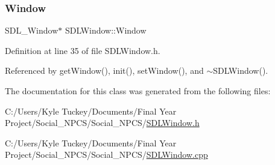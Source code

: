 \subsubsection{\texorpdfstring{Window}{Window}}
{\footnotesize\ttfamily S\+D\+L\+\_\+\+Window$\ast$ S\+D\+L\+Window\+::\+Window\hspace{0.3cm}{\ttfamily [private]}}



Definition at line 35 of file S\+D\+L\+Window.\+h.



Referenced by get\+Window(), init(), set\+Window(), and $\sim$\+S\+D\+L\+Window().



The documentation for this class was generated from the following files\+:\begin{DoxyCompactItemize}
\item 
C\+:/\+Users/\+Kyle Tuckey/\+Documents/\+Final Year Project/\+Social\+\_\+\+N\+P\+C\+S/\+Social\+\_\+\+N\+P\+C\+S/\hyperlink{_s_d_l_window_8h}{S\+D\+L\+Window.\+h}\item 
C\+:/\+Users/\+Kyle Tuckey/\+Documents/\+Final Year Project/\+Social\+\_\+\+N\+P\+C\+S/\+Social\+\_\+\+N\+P\+C\+S/\hyperlink{_s_d_l_window_8cpp}{S\+D\+L\+Window.\+cpp}\end{DoxyCompactItemize}
